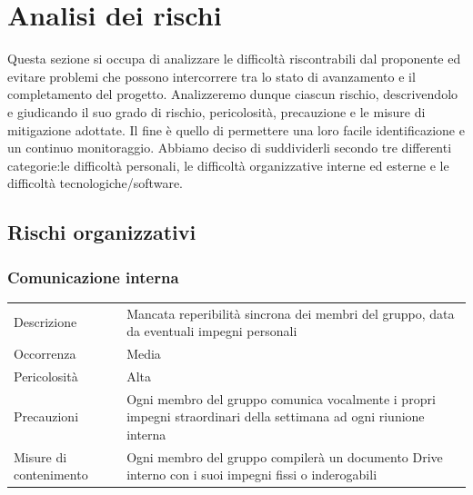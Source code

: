 \documentclass{article}
\begin{document}
\section{Analisi dei rischi}
Questa sezione si occupa di analizzare le difficoltà riscontrabili dal proponente ed evitare problemi che possono intercorrere tra lo stato di avanzamento e il completamento del progetto. Analizzeremo dunque ciascun rischio, descrivendolo e giudicando il suo grado di rischio, pericolosità, precauzione e le misure di mitigazione adottate. Il fine è quello di permettere una loro facile identificazione e un continuo monitoraggio. Abbiamo deciso di suddividerli secondo tre differenti categorie:le difficoltà personali, le difficoltà organizzative interne ed esterne e le difficoltà tecnologiche/software.

\subsection{Rischi organizzativi}
\subsubsection{Comunicazione interna}
\begin{center}
\begin{tabular}{P{10em} P{20em}} 
     Descrizione & Mancata reperibilità sincrona dei membri del gruppo, data da eventuali impegni personali\\ 
    Occorrenza & Media\\
    Pericolosità & Alta \\
    Precauzioni & Ogni membro del gruppo comunica vocalmente i propri impegni straordinari della settimana ad ogni riunione interna \\
    Misure di contenimento & Ogni membro del gruppo compilerà un documento Drive interno  con i suoi impegni fissi o inderogabili \\
\end{tabular}
\label{tab:cominterna}
\end{center}
\end{document}
